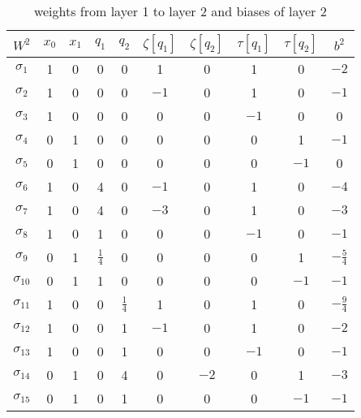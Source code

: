 \begin{table}[p]
	\centering
	\begin{tabular}{|c| c c c c c c c c |c|}
		\hline 
		$W^2$ & $x_0$ & $x_1$ & $q_1$ & $q_2$ & $\zeta[q_1]$ & $\zeta[q_2]$ & $\tau[q_1]$ & $\tau[q_2]$ & $b^2$ \\
		\hline
		$\sigma_1$ & 1 & 0 & 0 & 0 & 1 & 0 & 1 & 0 & $-2$ \\
		$\sigma_2$ & 1 & 0 & 0 & 0 & $-1$ & 0 & 1 & 0 & $-1$ \\
		$\sigma_3$ & 1 & 0 & 0 & 0 & 0 & 0 & $-1$ & 0 & 0 \\
		$\sigma_4$ & 0 & 1 & 0 & 0 & 0 & 0 & 0 & 1 & $-1$ \\
		$\sigma_5$ & 0 & 1 & 0 & 0 & 0 & 0 & 0 & $-1$ & 0 \\
		$\sigma_6$ & 1 & 0 & 4 & 0 & $-1$ & 0 & 1 & 0 & $-4$ \\
		$\sigma_7$ & 1 & 0 & 4 & 0 & $-3$ & 0 & 1 & 0 & $-3$ \\
		$\sigma_8$ & 1 & 0 & 1 & 0 & 0 & 0 & $-1$ & 0 & $-1$ \\
		$\sigma_9$ & 0 & 1 & $\frac{1}{4}$ & 0 & 0 & 0 & 0 & 1 & $-\frac{5}{4}$ \\
		$\sigma_{10}$ & 0 & 1 & 1 & 0 & 0 & 0 & 0 & $-1$ & $-1$ \\
		$\sigma_{11}$ & 1 & 0 & 0 & $\frac{1}{4}$ & 1 & 0 & 1 & 0 & $-\frac{9}{4}$ \\
		$\sigma_{12}$ & 1 & 0 & 0 & 1 & $-1$ & 0 & 1 & 0 & $-2$ \\
		$\sigma_{13}$ & 1 & 0 & 0 & 1 & 0 & 0 & $-1$ & 0 & $-1$ \\
		$\sigma_{14}$ & 0 & 1 & 0 & 4 & 0 & $-2$ & 0 & 1 & $-3$ \\
		$\sigma_{15}$ & 0 & 1 & 0 & 1 & 0 & 0 & 0 & $-1$ & $-1$ \\
		\hline
	\end{tabular}
	\caption{weights from layer 1 to layer 2 and biases of layer 2}
	\label{tab:W2b2ex}
\end{table}